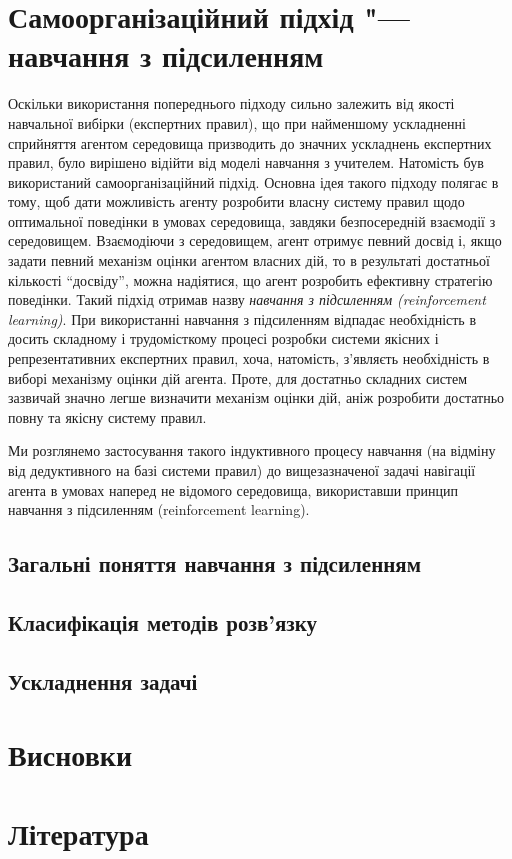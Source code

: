\documentclass[a4paper,10pt]{article}
\begin{document}
\section{Самоорганізаційний підхід "--- навчання з підсиленням}

Оскільки використання попереднього підходу сильно залежить від якості навчальної вибірки (експертних правил), що при найменшому ускладненні сприйняття агентом середовища призводить до значних ускладнень експертних правил, було вирішено відійти від моделі навчання з учителем. Натомість був використаний самоорганізаційний підхід. Основна ідея такого підходу полягає в тому, щоб дати можливість агенту розробити власну систему правил щодо оптимальної поведінки в умовах середовища, завдяки безпосередній взаємодії з середовищем. Взаємодіючи з середовищем, агент отримує певний досвід і, якщо задати певний механізм оцінки агентом власних дій, то в результаті достатньої кількості ``досвіду'', можна надіятися, що агент розробить ефективну стратегію поведінки. Такий підхід отримав назву \emph{навчання з підсиленням (reinforcement learning)}. При використанні навчання з підсиленням відпадає необхідність в досить складному і трудомісткому процесі розробки системи якісних і репрезентативних експертних правил, хоча, натомість, з'являєть необхідність в виборі механізму оцінки дій агента. Проте, для достатньо складних систем зазвичай значно легше визначити механізм оцінки дій, аніж розробити достатньо повну та якісну систему правил.

Ми розглянемо застосування такого індуктивного процесу навчання (на відміну від дедуктивного на базі системи правил) до вищезазначеної задачі навігації агента в умовах наперед не відомого середовища, використавши принцип навчання з підсиленням (reinforcement learning).

\subsection{Загальні поняття навчання з підсиленням}
\subsection{Класифікація методів розв'язку}
\subsection{Ускладнення задачі}
\section{Висновки}
\section{Література}
\begin{thebibliography}{99}
\end{thebibliography}
\end{document}
